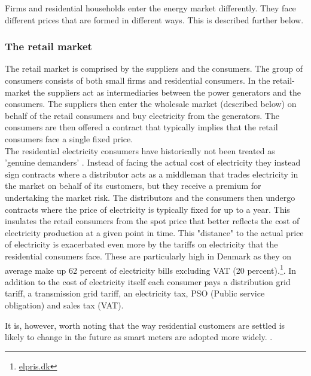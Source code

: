Firms and residential households enter the energy market differently. They face different prices that are formed in different ways. This is described further below.

\subsubsection{The retail market}
\label{subsubsec: t_resmarket}
The retail market is comprised by the suppliers and the consumers. The group of consumers consists of both small firms and residential consumers. In the retail-market the suppliers act as intermediaries between the power generators and the consumers. The suppliers then enter the wholesale market (described below) on behalf of the retail consumers and buy electricity from the generators. The consumers are then offered a contract that typically implies that the retail consumers face a single fixed price. %
\smallskip \\
The residential electricity consumers have historically not been treated as 'genuine demanders' \citep{kirschen2003demand}. Instead of facing the actual cost of electricity they instead sign contracts where a distributor acts as a middleman that trades electricity in the market on behalf of its customers, but they receive a premium for undertaking the market risk. The distributors and the consumers then undergo contracts where the price of electricity is typically fixed for up to a year. This insulates the retail consumers from the spot price that better reflects the cost of electricity production at a given point in time. This "distance" to the actual price of electricity is exacerbated even more by the tariffs on electricity that the residential consumers face. These are particularly high in Denmark as they on average make up 62 percent of electricity bills excluding VAT (20 percent).\footnote{\href{https://elpris.dk}{elpris.dk}}. In addition to the cost of electricity itself each consumer pays a distribution grid tariff, a transmission grid tariff, an electricity tax, PSO (Public service obligation) and sales tax (VAT).
\medskip

It is, however, worth noting that the way residential customers are settled is likely to change in the future as smart meters are adopted more widely. .
\medskip

